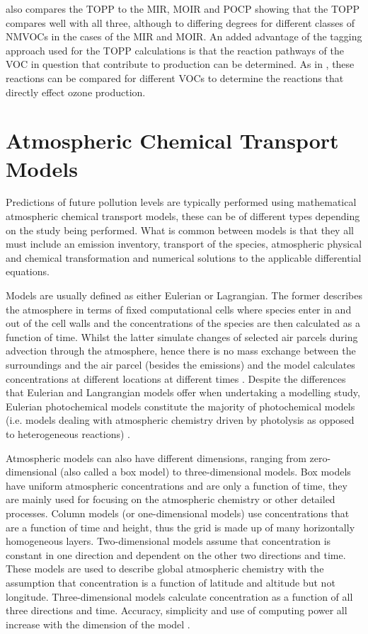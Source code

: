 \citep{Butler:2011} also compares the TOPP to the MIR, MOIR and POCP showing that the TOPP compares well with all three, 
although to differing degrees for different classes of NMVOCs in the cases of the MIR and MOIR. An added advantage of the 
tagging approach used for the TOPP calculations is that the reaction pathways of the VOC in question that contribute to 
production can be determined. As in \citep{Butler:2011}, these reactions can be compared for different VOCs to determine the 
reactions that directly effect ozone production.

\section{Atmospheric Chemical Transport Models}
Predictions of future  pollution levels are typically performed using mathematical atmospheric chemical transport 
models, these can be of different types depending on the study being performed. What is common between models is that they all 
must include an emission inventory, transport of the species, atmospheric physical and chemical transformation and numerical 
solutions to the applicable differential equations. 

Models are usually defined as either Eulerian or Lagrangian. The former describes the atmosphere in terms of fixed 
computational cells where species enter in and out of the cell walls and the concentrations of the species are then calculated 
as a function of time. Whilst the latter simulate changes of selected air parcels during advection through the atmosphere, 
hence there is no mass exchange between the surroundings and the air parcel (besides the emissions) and the model calculates 
concentrations at different locations at different times \citep{Seinfeld:2006}. Despite the differences that Eulerian and 
Langrangian models offer when undertaking a modelling study, Eulerian photochemical models constitute the majority of 
photochemical models (i.e. models dealing with atmospheric chemistry driven by photolysis as opposed to heterogeneous 
reactions) \citep{Russell:2000}.

Atmospheric models can also have different dimensions, ranging from zero-dimensional (also called a box model) to 
three-dimensional models. Box models have uniform atmospheric concentrations and are only a function of time, they are mainly 
used for focusing on the atmospheric chemistry or other detailed processes. Column models (or one-dimensional models) use 
concentrations that are a function of time and height, thus the grid is made up of many horizontally homogeneous layers. 
Two-dimensional models assume that concentration is constant in one direction and dependent on the other two directions and 
time. These models are used to describe global atmospheric chemistry with the assumption that concentration is a function of 
latitude and altitude but not longitude.  Three-dimensional models calculate concentration as a function of all three 
directions and time. Accuracy, simplicity and use of computing power all increase with the dimension of the model 
\citep{Seinfeld:2006}.

